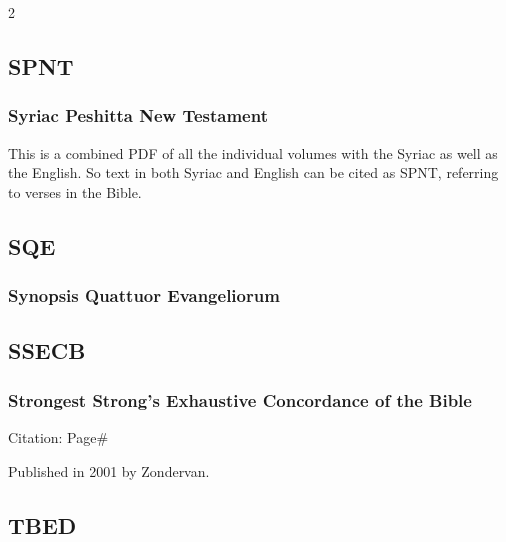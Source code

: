 \begin{multicols}{2}
	\subsection*{SPNT}
	
		\subsubsection*{Syriac Peshitta New Testament}
		
			This is a combined PDF of all the individual volumes with the Syriac as well as the English. So text in both Syriac and English can be cited as SPNT, referring to verses in the Bible.
			
	\subsection*{SQE}
	
		\subsubsection*{Synopsis Quattuor Evangeliorum}
		
			\phantom{.}
		
	\subsection*{SSECB}
	
		\subsubsection*{Strongest Strong's Exhaustive Concordance of the Bible}
		
			Citation:
				Page\#
				
			Published in 2001 by Zondervan.
			
	\subsection*{TBED}
	

\end{multicols}
